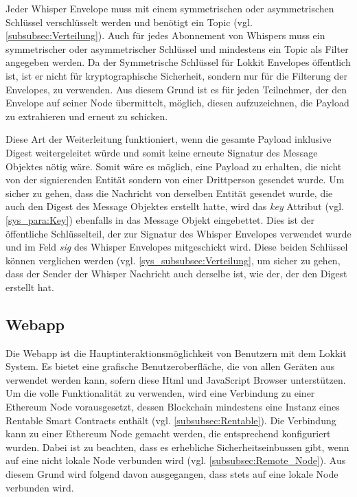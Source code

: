 Jeder Whisper Envelope muss mit einem symmetrischen oder asymmetrischen Schlüssel verschlüsselt werden und benötigt ein Topic (vgl. \ref{subsubsec:Verteilung}).
Auch für jedes Abonnement von Whispers muss ein symmetrischer oder asymmetrischer Schlüssel und mindestens ein Topic als Filter angegeben werden. Da der Symmetrische Schlüssel für Lokkit Envelopes öffentlich ist, ist er nicht für kryptographische Sicherheit, sondern nur für die Filterung der Envelopes, zu verwenden. Aus diesem Grund ist es für jeden Teilnehmer, der den Envelope auf seiner Node übermittelt, möglich, diesen aufzuzeichnen, die Payload zu extrahieren und erneut zu schicken.\cite{replay_attack_on_security_protocols}

Diese Art der Weiterleitung funktioniert, wenn die gesamte Payload inklusive Digest weitergeleitet würde und somit keine erneute Signatur des Message Objektes nötig wäre. Somit wäre es möglich, eine Payload zu erhalten, die nicht von der signierenden Entität sondern von einer Drittperson gesendet wurde. Um sicher zu gehen, dass die Nachricht von derselben Entität gesendet wurde, die auch den Digest des Message Objektes erstellt hatte, wird das \emph{key} Attribut (vgl. \ref{sys_para:Key}) ebenfalls in das Message Objekt eingebettet. Dies ist der öffentliche Schlüsselteil, der zur Signatur des Whisper Envelopes verwendet wurde und im Feld \emph{sig} des Whisper Envelopes mitgeschickt wird. Diese beiden Schlüssel können verglichen werden (vgl. \ref{sys_subsubsec:Verteilung}, um sicher zu gehen, dass der Sender der Whisper Nachricht auch derselbe ist, wie der, der den Digest erstellt hat.

\subsection{Webapp}
\label{subsec:Webapp}
Die Webapp ist die Hauptinteraktionsmöglichkeit von Benutzern mit dem Lokkit System. Es bietet eine grafische Benutzeroberfläche, die von allen Geräten aus verwendet werden kann, sofern diese Html und JavaScript Browser unterstützen. Um die volle Funktionalität zu verwenden, wird eine Verbindung zu einer Ethereum Node vorausgesetzt, dessen Blockchain mindestens eine Instanz eines Rentable Smart Contracts enthält (vgl. \ref{subsubsec:Rentable}). Die Verbindung kann zu einer Ethereum Node gemacht werden, die entsprechend konfiguriert wurden. Dabei ist zu beachten, dass es erhebliche Sicherheitseinbussen gibt, wenn auf eine nicht lokale Node verbunden wird (vgl. \ref{subsubsec:Remote_Node}). Aus diesem Grund wird folgend davon ausgegangen, dass stets auf eine lokale Node verbunden wird.

